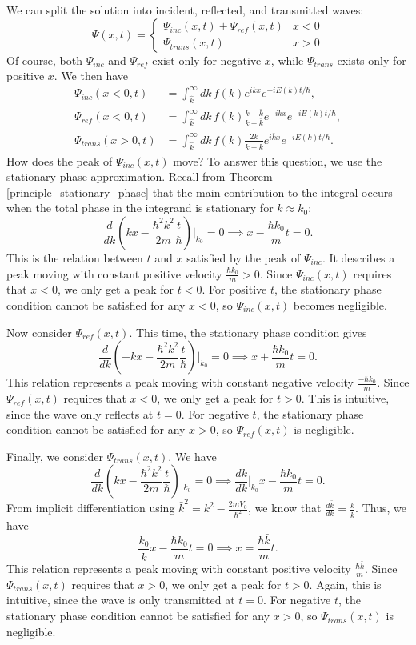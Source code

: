 We can split the solution into incident, reflected, and transmitted waves: $$\Psi(x,t)=\begin{cases}\Psi_{inc}(x,t)+\Psi_{ref}(x,t) & x<0 \\ \Psi_{trans}(x,t) & x>0\end{cases}$$Of course, both $\Psi_{inc}$ and $\Psi_{ref}$ exist only for negative $x$, while $\Psi_{trans}$ exists only for positive $x$. We then have \begin{align*}\Psi_{inc}(x<0,t)&=\int_{\hat{k}}^\infty dk\,f(k)e^{ikx}e^{-iE(k)t/\hbar}, \\ \Psi_{ref}(x<0,t)&=\int_{\hat{k}}^\infty dk\,f(k)\frac{k-\bar{k}}{k+\bar{k}}e^{-ikx}e^{-iE(k)t/\hbar}, \\ \Psi_{trans}(x>0,t)&=\int_{\hat{k}}^\infty dk\,f(k)\frac{2k}{k+\bar{k}}e^{i\bar{k}x}e^{-iE(k)t/\hbar}.\end{align*}How does the peak of $\Psi_{inc}(x,t)$ move? To answer this question, we use the stationary phase approximation. Recall from Theorem \ref{principle_stationary_phase} that the main contribution to the integral occurs when the total phase in the integrand is stationary for $k\approx k_0$: $$\frac{d}{dk}(kx-\frac{\hbar^2k^2}{2m}\frac{t}{\hbar})\bigg|_{k_0}=0\implies x-\frac{\hbar k_0}{m}t=0.$$This is the relation between $t$ and $x$ satisfied by the peak of $\Psi_{inc}$. It describes a peak moving with constant positive velocity $\frac{\hbar k_0}{m}>0$. Since $\Psi_{inc}(x,t)$ requires that $x<0$, we only get a peak for $t<0$. For positive $t$, the stationary phase condition cannot be satisfied for any $x<0$, so $\Psi_{inc}(x,t)$ becomes negligible.

Now consider $\Psi_{ref}(x,t)$. This time, the stationary phase condition gives $$\frac{d}{dk}(-kx-\frac{\hbar^2 k^2}{2m}\frac{t}{\hbar})\bigg|_{k_0}=0\implies x+\frac{\hbar k_0}{m}t=0.$$This relation represents a peak moving with constant negative velocity $\frac{-\hbar k_0}{m}$. Since $\Psi_{ref}(x,t)$ requires that $x<0$, we only get a peak for $t>0$. This is intuitive, since the wave only reflects at $t=0$. For negative $t$, the stationary phase condition cannot be satisfied for any $x>0$, so $\Psi_{ref}(x,t)$ is negligible.

Finally, we consider $\Psi_{trans}(x,t)$. We have $$\frac{d}{dk}(\bar{k}x-\frac{\hbar^2k^2}{2m}\frac{t}{\hbar})\bigg|_{k_0}=0\implies \frac{d\bar{k}}{dk}\bigg|_{k_0}x-\frac{\hbar k_0}{m}t=0.$$From implicit differentiation using $\bar{k}^2=k^2-\frac{2mV_0}{\hbar^2}$, we know that $\frac{d\bar{k}}{dk}=\frac{k}{\bar{k}}$. Thus, we have $$\frac{k_0}{\bar{k}}x-\frac{\hbar k_0}{m}t=0\implies x=\frac{\hbar\bar{k}}{m}t.$$This relation represents a peak moving with constant positive velocity $\frac{\hbar\bar{k}}{m}$. Since $\Psi_{trans}(x,t)$ requires that $x>0$, we only get a peak for $t>0$. Again, this is intuitive, since the wave is only transmitted at $t=0$. For negative $t$, the stationary phase condition cannot be satisfied for any $x>0$, so $\Psi_{trans}(x,t)$ is negligible. 

